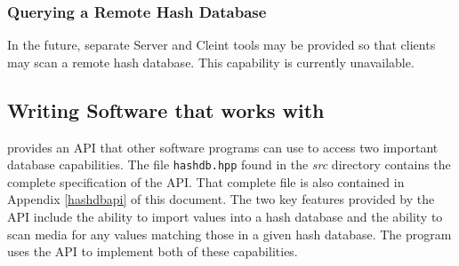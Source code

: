\documentclass[11pt,fleqn]{article} %
\begin{document}
\subsubsection{Querying a Remote Hash Database}
In the future, separate \hdb Server and Cleint tools may be provided so that clients may scan a remote hash database.  This capability is currently unavailable.


%
%
%
%
%

\subsection{Writing Software that works with \hdb}
\label{APISection}
\hdb provides an API that other software programs can use to access two important database capabilities. The file \texttt{hashdb.hpp} found in the \textit{src} directory contains the complete specification of the API. That complete file is also contained in Appendix \ref{hashdbapi} of this document.  The two key features provided by the API include the ability to import values into a hash database and the ability to scan media for any values matching those in a given hash database.  The \bulk program uses the \hdb API to implement both of these capabilities.\\
\end{document}
